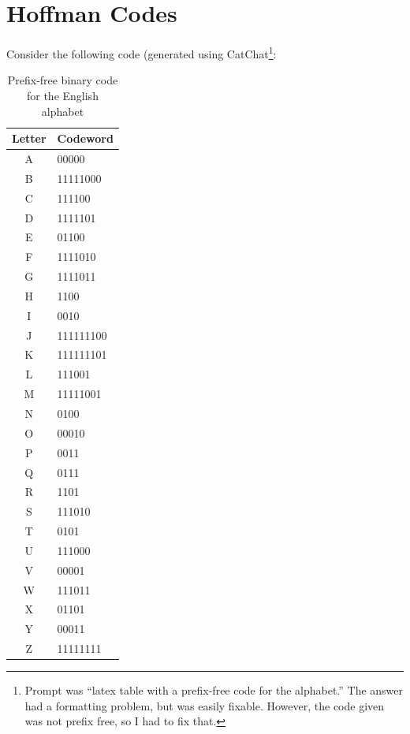 \documentclass{article}
\begin{document}
\newpage
\section*{Hoffman Codes}

Consider the following code (generated using CatChat\footnote{Prompt was ``latex
table with a prefix-free code for the alphabet.'' The answer had a formatting
problem, but was easily fixable. However, the code given was not prefix free, so
I had to fix that.}:

\begin{table}[ht]
    \centering
    \caption{Prefix‑free binary code for the English alphabet}
    \label{tab:prefixfree}
    \begin{tabular}{cl}
        \toprule
        \textbf{Letter} & \textbf{Codeword} \\
        \midrule
        A & 00000 \\
        B & 11111000 \\
        C & 111100 \\
        D & 1111101 \\
        E & 01100 \\
        F & 1111010 \\
        G & 1111011 \\
        H & 1100 \\
        I & 0010 \\
        J & 111111100 \\
        K & 111111101 \\
        L & 111001 \\
        M & 11111001 \\
        N & 0100 \\
        O & 00010 \\
        P & 0011 \\
        Q & 0111 \\
        R & 1101 \\
        S & 111010 \\
        T & 0101 \\
        U & 111000 \\
        V & 00001 \\
        W & 111011 \\
        X & 01101 \\
        Y & 00011 \\
        Z & 11111111 \\
        \bottomrule
    \end{tabular}
\end{table}
\end{document}
